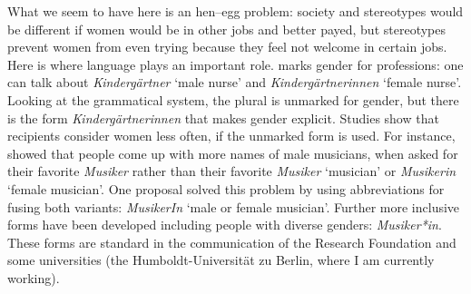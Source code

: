 What we seem to have here is an hen--egg problem: society and stereotypes would be different if women
would be in other jobs and better payed, but stereotypes prevent women from even trying because they
feel not welcome in certain jobs. Here is where language plays an important role.  marks
gender for professions: one can talk about \emph{Kindergärtner} `male nurse' and
\emph{Kindergärtnerinnen} `female nurse'. Looking at the  grammatical system, the plural is unmarked for
gender, but there is the form \emph{Kindergärtnerinnen} that makes gender explicit. Studies show
that recipients consider women less often, if the unmarked form is used. For instance, \citet{SSB2001a}
showed that people come up with more names of male musicians, when asked for their favorite \emph{Musiker} rather than
their favorite \emph{Musiker} `musician' or \emph{Musikerin} `female musician'. One proposal solved this
problem by using abbreviations for fusing both variants: \emph{MusikerIn} `male or female musician'. Further more inclusive
forms have been developed including people with diverse genders: \emph{Musiker*in}. These forms are
standard in the communication of the  Research Foundation and some universities (\eg the
Humboldt-Universität zu Berlin, where I am currently working).    

